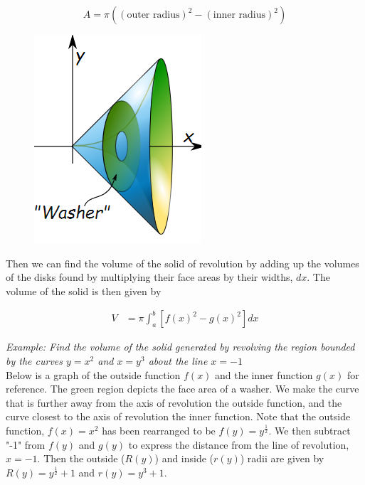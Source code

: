         \begin{equation*}
            A = \pi((\text{outer radius})^2-(\text{inner radius})^2)
        \end{equation*}

        \begin{figure}[hbt!]
            \centering
            \includegraphics[scale=0.75]{Resources/Unit5IntegrationApps/Washer1}
        \end{figure}

        \noindent Then we can find the volume of the solid of revolution by adding up the
        volumes of the disks found by multiplying their face areas by their widths, $dx$. The
        volume of the solid is then given by

        \begin{align*}
            V   &= \pi\int^b_a [f(x)^2-g(x)^2]dx
        \end{align*}

        \noindent \color{blue} \textit{Example: Find the volume of the solid generated by
        revolving the region bounded by the curves $y=x^2$ and $x=y^3$ about the line $x=-1$}
        \color{black} \\

        \noindent Below is a graph of the outside function $f(x)$ and the inner function $g(x)$
        for reference. The green region depicts the face area of a washer. We make the curve
        that is further away from the axis of revolution the outside function, and the curve
        closest to the axis of revolution the inner function.
        Note that the outside function, $f(x)=x^2$ has been rearranged to be
        $f(y)= y^{\frac{1}{2}}$. We then subtract "-1" from $f(y)$ and $g(y)$ to express the
        distance from the line of revolution, $x=-1$. Then the outside ($R(y)$) and inside
        ($r(y)$) radii are given by $R(y)=y^\frac{1}{2}+1$ and $r(y)=y^3+1$.

